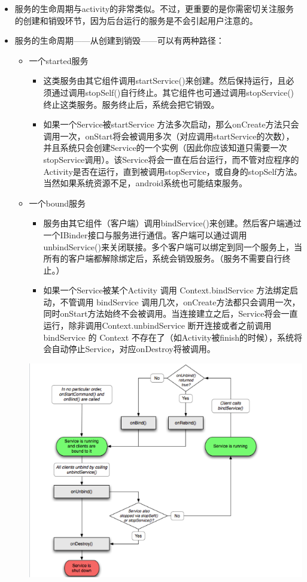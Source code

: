 \documentclass[9pt, b5paper]{article}
\begin{document}
\begin{itemize}
\begin{itemize}
\begin{itemize}
\begin{itemize}
\end{itemize}
\end{itemize}
\end{itemize}
\item 服务的生命周期与activity的非常类似。不过，更重要的是你需密切关注服务的创建和销毁环节，因为后台运行的服务是不会引起用户注意的。
\item 服务的生命周期——从创建到销毁——可以有两种路径：
\begin{itemize}
\item 一个started服务
\begin{itemize}
\item 这类服务由其它组件调用startService()来创建。然后保持运行，且必须通过调用stopSelf()自行终止。其它组件也可通过调用stopService() 终止这类服务。服务终止后，系统会把它销毁。
\item 如果一个Service被startService 方法多次启动，那么onCreate方法只会调用一次，onStart将会被调用多次（对应调用startService的次数），并且系统只会创建Service的一个实例（因此你应该知道只需要一次stopService调用）。该Service将会一直在后台运行，而不管对应程序的Activity是否在运行，直到被调用stopService，或自身的stopSelf方法。当然如果系统资源不足，android系统也可能结束服务。
\end{itemize}
\item 一个bound服务
\begin{itemize}
\item 服务由其它组件（客户端）调用bindService()来创建。然后客户端通过一个IBinder接口与服务进行通信。客户端可以通过调用unbindService()来关闭联接。多个客户端可以绑定到同一个服务上，当所有的客户端都解除绑定后，系统会销毁服务。（服务不需要自行终止。）
\item 如果一个Service被某个Activity 调用 Context.bindService 方法绑定启动，不管调用 bindService 调用几次，onCreate方法都只会调用一次，同时onStart方法始终不会被调用。当连接建立之后，Service将会一直运行，除非调用Context.unbindService 断开连接或者之前调用bindService 的 Context 不存在了（如Activity被finish的时候），系统将会自动停止Service，对应onDestroy将被调用。
\end{itemize}
\includegraphics[width=.9\linewidth]{./pic/service2.png}

\end{itemize}
\end{itemize}
\end{document}
